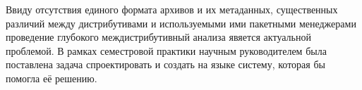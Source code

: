 Ввиду отсутствия единого формата архивов и их метаданных, существенных различий между дистрибутивами и используемыми ими пакетными менеджерами проведение глубокого междистрибутивный анализа явяется актуальной проблемой.
В рамках семестровой практики научным руководителем была поставлена задача спроектировать и создать на языке {\python} систему, которая бы помогла её решению.
